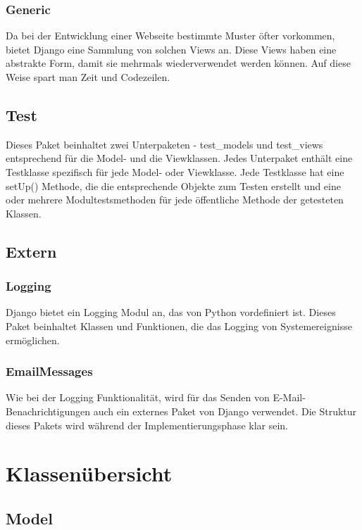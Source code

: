 \documentclass[parskip=full,11pt]{scrartcl}
\begin{document}
 \subsubsection{Generic}
Da bei der Entwicklung einer Webseite bestimmte Muster öfter vorkommen,  bietet Django eine Sammlung von solchen Views an. Diese Views haben eine abstrakte Form, damit sie mehrmals wiederverwendet werden können. Auf diese Weise spart man Zeit und Codezeilen.

 
 \subsection{Test}
Dieses Paket beinhaltet zwei Unterpaketen - test{\_}models und test{\_}views entsprechend für die Model- und die Viewklassen. Jedes Unterpaket enthält eine Testklasse spezifisch für jede Model- oder Viewklasse. Jede Testklasse hat eine setUp() Methode, die die entsprechende Objekte zum Testen erstellt und eine oder mehrere Modultestsmethoden für jede öffentliche Methode der getesteten Klassen.
 
 \subsection{Extern}
 \subsubsection{Logging}
Django bietet ein Logging Modul an, das von Python vordefiniert ist.
Dieses Paket beinhaltet Klassen und Funktionen, die das Logging von Systemereignisse ermöglichen. 
 \subsubsection{EmailMessages}
Wie bei der Logging Funktionalität, wird für das Senden von E-Mail-Benachrichtigungen auch ein externes Paket von Django verwendet. Die Struktur dieses Pakets wird während der Implementierungsphase klar sein. 
 
 
 \newpage
 \section{Klassenübersicht}
 \subsection{Model}
\end{document}

